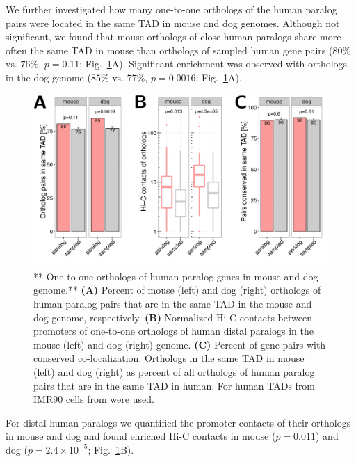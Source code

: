\documentclass[a4paper,twoside=true,openright,parskip=full,chapterprefix=true,11pt,headings=normal,bibliography=totoc,listof=totoc,titlepage=on,captions=tableabove,draft=false]{scrreprt}
\theoremstyle{definition}
\theoremstyle{definition}
\theoremstyle{definition}
\theoremstyle{remark}
\begin{document}
We further investigated how many one-to-one orthologs of the human
paralog pairs were located in the same TAD in mouse and dog genomes.
Although not significant, we found that mouse orthologs of close human
paralogs share more often the same TAD in mouse than orthologs of
sampled human gene pairs (\(80\%\) vs. \(76\%\), \(p=0.11\);
Fig.~\ref{fig:orthologsMouseDog}A). Significant enrichment was observed
with orthologs in the dog genome (\(85\%\) vs. \(77\%\), \(p=0.0016\);
Fig.~\ref{fig:orthologsMouseDog}A).

\begin{figure}

{\centering \includegraphics[width=0.75\linewidth]{figures/paralog/fig6_09} 

}

\caption{** One-to-one orthologs of human paralog genes
in mouse and dog genome.** \textbf{(A)} Percent of mouse (left) and dog
(right) orthologs of human paralog pairs that are in the same TAD in the
mouse and dog genome, respectively. \textbf{(B)} Normalized Hi-C
contacts between promoters of one-to-one orthologs of human distal
paralogs in the mouse (left) and dog (right) genome. \textbf{(C)}
Percent of gene pairs with conserved co-localization. Orthologs in the
same TAD in mouse (left) and dog (right) as percent of all orthologs of
human paralog pairs that are in the same TAD in human. For human TADs
from IMR90 cells from \citep{Rao2014} were used.}\label{fig:orthologsMouseDog}
\end{figure}












For distal human paralogs we quantified the promoter contacts of their
orthologs in mouse and dog and found enriched Hi-C contacts in mouse
(\(p=0.011\)) and dog (\(p=2.4\times 10^{-5}\);
Fig.~\ref{fig:orthologsMouseDog}B).
\end{document}
